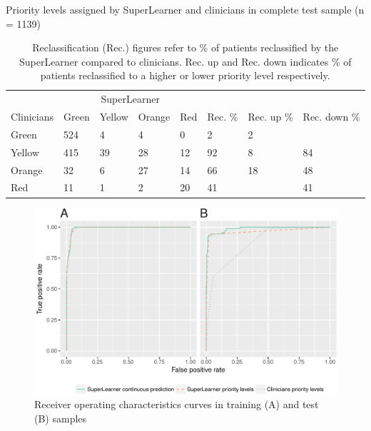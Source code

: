 \documentclass[10pt,letterpaper]{article}\usepackage[]{graphicx}\usepackage[]{color}
\begin{document}
\begin{table}[ht]
\centering
\caption{Priority levels assigned by SuperLearner and clinicians in complete test sample (n = 1139)} 
\label{tab:reclass_all}
\begin{tabular}{llllllll}
  \hline
  & \multicolumn{4}{c}{SuperLearner} \\
 Clinicians & Green & Yellow & Orange & Red & Rec. \% & Rec. up \% & Rec. down \% \\
 \hline
Green & 524 & 4 & 4 & 0 & 2 & 2 &  \\ 
  Yellow & 415 & 39 & 28 & 12 & 92 & 8 & 84 \\ 
  Orange & 32 & 6 & 27 & 14 & 66 & 18 & 48 \\ 
  Red & 11 & 1 & 2 & 20 & 41 &  & 41 \\ 
   \hline
\end{tabular}
\caption*{Reclassification (Rec.) figures refer to \% of patients reclassified by the SuperLearner compared to clinicians. Rec. up and Rec. down indicates \% of patients reclassified to a higher or lower priority level respectively.} 
\end{table}


\begin{figure}
  \caption{Receiver operating characteristics curves in training (A) and test
    (B) samples}
  \label{fig:roc_plot}
  \includegraphics[width=\textwidth]{roc_plot.pdf}
\end{figure}
\end{document}
